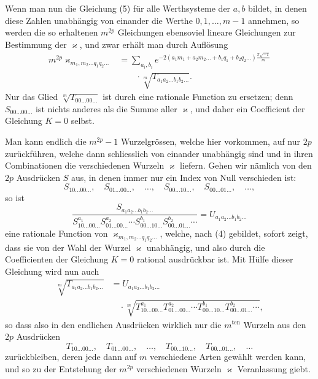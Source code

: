 \documentclass[10pt]{article}
\begin{document}
Wenn man nun die Gleichung (5) für alle Werthsysteme der \(a,b\) bildet, in denen diese Zahlen unabhängig von einander die Werthe \(0,1,\ldots,m-1\) annehmen, so werden die so erhaltenen \(m^{2p}\) Gleichungen ebensoviel lineare Gleichungen zur Bestimmung der \(\varkappa\), und zwar erhält man durch Auflösung
\[
\begin{aligned}
m^{2p}\varkappa_{m_1,m_2\ldots q_1q_2\ldots}
&=\sum_{a_i,b_i}
e^{-2(a_1m_1+a_2m_2\ldots+b_1q_1+b_2q_2\ldots)
\frac{\pi\sqrt{-1}}{m}}\\
&\qquad\cdot
\sqrt[m]{T_{a_1a_2\ldots b_1b_2\ldots}}.
\end{aligned}
\]
Nur das Glied \(\sqrt[m]{T_{00\ldots00\ldots}}\) ist durch eine rationale Function zu ersetzen; denn \(S_{00\ldots00\ldots}\) ist nichts anderes als die Summe aller \(\varkappa\), und daher ein Coefficient der Gleichung \(K=0\) selbst.

Man kann endlich die \(m^{2p}-1\) Wurzelgrössen, welche hier vorkommen, auf nur \(2p\) zurückführen, welche dann schliesslich von einander unabhängig sind und in ihren Combinationen die verschiedenen Wurzeln \(\varkappa\) liefern. Gehen wir nämlich von den \(2p\) Ausdrücken \(S\) aus, in denen immer nur ein Index von Null verschieden ist:
\[
S_{10\ldots00\ldots},\quad
S_{01\ldots00\ldots},\quad\ldots,\quad
S_{00\ldots10\ldots},\quad
S_{00\ldots01\ldots},\quad\ldots,
\]
so ist
\[
\frac{
S_{a_1a_2\ldots b_1b_2\ldots}
}{
S_{10\ldots00\ldots}^{a_1}
S_{01\ldots00\ldots}^{a_2}\cdots
S_{00\ldots10\ldots}^{b_1}
S_{00\ldots01\ldots}^{b_2}\cdots
}
=U_{a_1a_2\ldots b_1b_2\ldots}
\]
eine rationale Function von \(\varkappa_{m_1,m_2\ldots q_1q_2\ldots}\), welche, nach (4) gebildet, sofort zeigt, dass sie von der Wahl der Wurzel \(\varkappa\) unabhängig, und also durch die Coefficienten der Gleichung \(K=0\) rational ausdrückbar ist. Mit Hülfe dieser Gleichung wird nun auch
\[
\begin{aligned}
\sqrt[m]{T_{a_1a_2\ldots b_1b_2\ldots}}
&=
U_{a_1a_2\ldots b_1b_2\ldots}\\
&\quad\cdot
\sqrt[m]{
T_{10\ldots00\ldots}^{a_1}
T_{01\ldots00\ldots}^{a_2}
\cdots
T_{00\ldots10\ldots}^{b_1}
T_{00\ldots01\ldots}^{b_2}
\cdots},
\end{aligned}
\]
so dass also in den endlichen Ausdrücken wirklich nur die \(m^{\text{ten}}\) Wurzeln aus den \(2p\) Ausdrücken
\[
T_{10\ldots00\ldots},\quad
T_{01\ldots00\ldots},\quad\ldots,\quad
T_{00\ldots10\ldots},\quad
T_{00\ldots01\ldots},\quad\ldots
\]
zurückbleiben, deren jede dann auf \(m\) verschiedene Arten gewählt werden kann, und so zu der Entstehung der \(m^{2p}\) verschiedenen Wurzeln \(\varkappa\) Veranlassung giebt.
\end{document}
